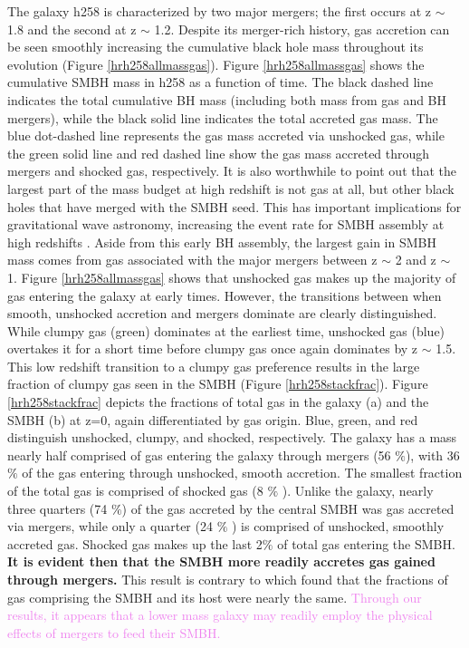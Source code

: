 \documentclass[manuscript]{aastex}
\begin{document}
The galaxy h258 is characterized by two major mergers; the first occurs at z $\sim$ 1.8 and the second at z $\sim$ 1.2. Despite its merger-rich history, gas accretion can be seen smoothly increasing the cumulative black hole mass throughout its evolution (Figure \ref{hrh258allmassgas}). Figure \ref{hrh258allmassgas} shows the cumulative SMBH mass in h258 as a function of time. The black dashed line indicates the total cumulative BH mass (including both mass from gas and BH mergers), while the black solid line indicates the total accreted gas mass. The blue dot-dashed line represents the gas mass accreted via unshocked gas, while the green solid line and red dashed line show the gas mass accreted through mergers and shocked gas, respectively. It is also worthwhile to point out that the largest part of the mass budget at high redshift is not gas at all, but other black holes that have merged with the SMBH seed. This has important implications for gravitational wave astronomy, increasing the event rate for SMBH assembly at high redshifts \citep{Holley-Bockelmann2010}. Aside from this early BH assembly, the largest gain in SMBH mass comes from gas associated with the major mergers between z $\sim$ 2 and z $\sim$ 1. Figure \ref{hrh258allmassgas} shows that unshocked gas makes up the majority of gas entering the galaxy at early times. However, the transitions between when smooth, unshocked accretion and mergers dominate are clearly distinguished. While clumpy gas (green) dominates at the earliest time, unshocked gas (blue) overtakes it for a short time before clumpy gas once again dominates by z $\sim$ 1.5. 
This low redshift transition to a clumpy gas preference results in the large fraction of clumpy gas seen in the SMBH (Figure \ref{hrh258stackfrac}). Figure \ref{hrh258stackfrac} depicts the fractions of total gas in the galaxy (a) and the SMBH (b) at z=0, again differentiated by gas origin. Blue, green, and red distinguish unshocked, clumpy, and shocked, respectively. The galaxy has a mass nearly half comprised of gas entering the galaxy through mergers (56 $\%$), with 36 $\%$ of the gas entering through unshocked, smooth accretion. The smallest fraction of the total gas is comprised of shocked gas (8 $\%$ ). Unlike the galaxy, nearly three quarters (74 $\%$) of the gas accreted by the central SMBH was gas accreted via mergers, while only a quarter (24 $\%$ ) is comprised of unshocked, smoothly accreted gas. Shocked gas makes up the last 2$\%$ of total gas entering the SMBH. \textbf{It is evident then that the SMBH more readily accretes gas gained through mergers.} This result is contrary to \cite{Bellovary2013} which found that the fractions of gas comprising the SMBH and its host were nearly the same. \textcolor{violet}{Through our results, it appears that a lower mass galaxy may readily employ the physical effects of mergers to feed their SMBH.}
\end{document}
